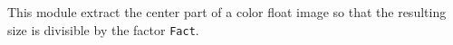 This module extract the center part of a color float image
so that the resulting size is divisible by the factor \verb+Fact+.
